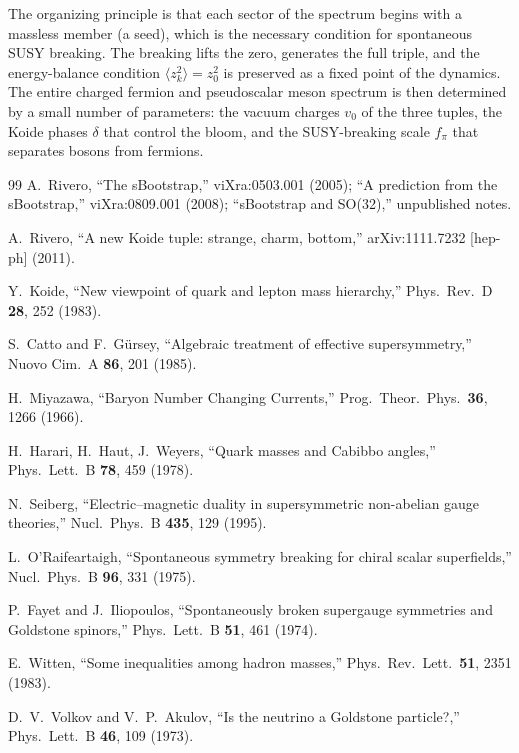 \documentclass[12pt,a4paper]{article}
\begin{document}
The organizing principle is that each sector of the spectrum begins 
with a massless member (a seed), which is the necessary condition 
for spontaneous SUSY breaking. The breaking lifts the zero, 
generates the full triple, and the energy-balance condition 
$\langle z_k^2\rangle = z_0^2$ is preserved as a fixed point 
of the dynamics. The entire charged fermion and pseudoscalar meson 
spectrum is then determined by a small number of parameters: the 
vacuum charges $v_0$ of the three tuples, the Koide phases 
$\delta$ that control the bloom, and the SUSY-breaking scale 
$f_\pi$ that separates bosons from fermions.

\begin{thebibliography}{99}
A.~Rivero, ``The sBootstrap,'' viXra:0503.001 (2005);
``A prediction from the sBootstrap,'' viXra:0809.001 (2008);
``sBootstrap and SO(32),'' unpublished notes.

A.~Rivero, ``A new Koide tuple: strange, charm, bottom,'' 
arXiv:1111.7232 [hep-ph] (2011).

Y.~Koide, ``New viewpoint of quark and lepton mass hierarchy,'' 
Phys.\ Rev.\ D \textbf{28}, 252 (1983).

S.~Catto and F.~G\"ursey, ``Algebraic treatment of effective 
supersymmetry,'' Nuovo Cim.\ A \textbf{86}, 201 (1985).

H.~Miyazawa, ``Baryon Number Changing Currents,'' 
Prog.\ Theor.\ Phys.\ \textbf{36}, 1266 (1966).

H.~Harari, H.~Haut, J.~Weyers, ``Quark masses and Cabibbo 
angles,'' Phys.\ Lett.\ B \textbf{78}, 459 (1978).

N.~Seiberg, ``Electric--magnetic duality in supersymmetric 
non-abelian gauge theories,'' Nucl.\ Phys.\ B \textbf{435}, 129 
(1995).

L.~O'Raifeartaigh, ``Spontaneous symmetry breaking for chiral 
scalar superfields,'' Nucl.\ Phys.\ B \textbf{96}, 331 (1975).

P.~Fayet and J.~Iliopoulos, ``Spontaneously broken supergauge 
symmetries and Goldstone spinors,'' Phys.\ Lett.\ B \textbf{51}, 
461 (1974).

E.~Witten, ``Some inequalities among hadron masses,'' 
Phys.\ Rev.\ Lett.\ \textbf{51}, 2351 (1983).

D.~V.~Volkov and V.~P.~Akulov, ``Is the neutrino a Goldstone 
particle?,'' Phys.\ Lett.\ B \textbf{46}, 109 (1973).


\end{thebibliography}
\end{document}
